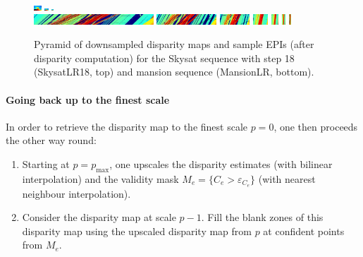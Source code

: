 \documentclass{article}
\theoremstyle{definition}
\begin{document}
\begin{figure}[th]
  \includegraphics[width=0.025\textwidth]{images/pyr/1521751973001_pyr_depth_004.png}
  \includegraphics[width=0.0125\textwidth]{images/pyr/1521751973001_pyr_depth_005.png}
  \includegraphics[width=0.00625\textwidth]{images/pyr/1521751973001_pyr_depth_006.png}\\
  \includegraphics[width=0.4\textwidth]{images/pyr/1521751973001_pyr_epi_000.png}
  \includegraphics[width=0.2\textwidth]{images/pyr/1521751973001_pyr_epi_001.png}
  \includegraphics[width=0.1\textwidth]{images/pyr/1521751973001_pyr_epi_002.png}
  \includegraphics[width=0.05\textwidth]{images/pyr/1521751973001_pyr_epi_003.png}
  \includegraphics[width=0.025\textwidth]{images/pyr/1521751973001_pyr_epi_004.png}
  \includegraphics[width=0.0125\textwidth]{images/pyr/1521751973001_pyr_epi_005.png}
  \includegraphics[width=0.00625\textwidth]{images/pyr/1521751973001_pyr_epi_006.png}
  \caption{Pyramid of downsampled disparity maps and sample EPIs (after disparity computation) for the Skysat sequence with step 18 (SkysatLR18, top) and mansion sequence (MansionLR, bottom).}
  \label{fig:pyramid}
\end{figure}


\paragraph{Going back up to the finest scale} In order to retrieve the disparity map to the finest scale $p=0$, one then proceeds the other way round:
\begin{enumerate}
 \item Starting at $p=p_{\max}$, one upscales the disparity estimates (with bilinear interpolation) and the validity mask $M_e = \{C_e > \varepsilon_{C_e}\}$ (with nearest neighbour interpolation).
 \item Consider the disparity map at scale $p-1$. Fill the blank zones of this disparity map using the upscaled disparity map from $p$ at confident points from $M_e$.
\end{enumerate}
\end{document}
